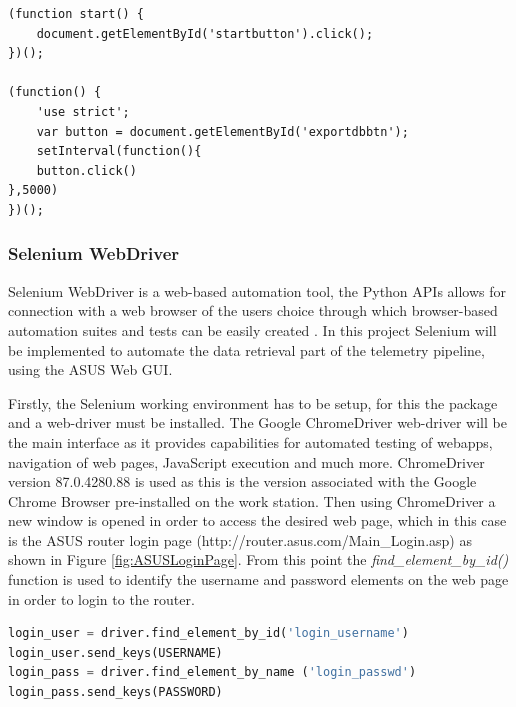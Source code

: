 \begin{lstlisting}[language=HTML, caption={Tampermonkey Data Collection Userscript Snippet}, label={lst:tampermonkey}]
(function start() {
    document.getElementById('startbutton').click();
})();

(function() {
    'use strict';
    var button = document.getElementById('exportdbbtn');
    setInterval(function(){
	button.click()
},5000)
})();
\end{lstlisting}




\subsubsection{Selenium WebDriver}

Selenium WebDriver is a web-based automation tool, the Python APIs allows for connection with a web browser of the users choice through which browser-based automation suites and tests can be easily created \cite{selenium}. In this project Selenium will be implemented to automate the data retrieval part of the telemetry pipeline, using the ASUS Web GUI. 

Firstly, the Selenium working environment has to be setup, for this the package and a web-driver must be installed. The Google ChromeDriver web-driver will be the main interface as it provides capabilities for automated testing of webapps, navigation of web pages, JavaScript execution and much more. ChromeDriver version 87.0.4280.88 is used as this is the version associated with the Google Chrome Browser pre-installed on the work station. Then using ChromeDriver a new window is opened in order to access the desired web page, which in this case is the ASUS router login page (http://router.asus.com/Main\_Login.asp) as shown in Figure \ref{fig:ASUSLoginPage}. From this point the \textit{find\_element\_by\_id()} function is used to identify the username and password elements on the web page in order to login to the router. 

\begin{lstlisting}[language=Python, caption={ASUS Router Login Code Snippet (Selenium)}, label={lst:selenium}]
login_user = driver.find_element_by_id('login_username')
login_user.send_keys(USERNAME)
login_pass = driver.find_element_by_name ('login_passwd')
login_pass.send_keys(PASSWORD)
\end{lstlisting}

